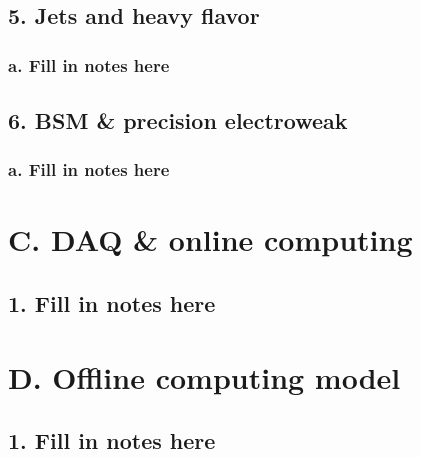 \documentclass{report}
\begin{document}
\subsection{5. Jets and heavy flavor}
\subsubsection{a. Fill in notes here}
\subsection{6. BSM & precision electroweak}
\subsubsection{a. Fill in notes here}
%
\section{C. DAQ & online computing}
\subsection{1. Fill in notes here}
%
\section{D. Offline computing model}
\subsection{1. Fill in notes here}
\end{document}
